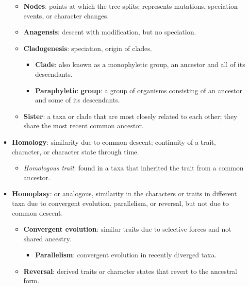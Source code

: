 \documentclass[12pt,a4paper]{article}
\begin{document}
\begin{itemize}
\begin{itemize}
\begin{itemize}
                \end{itemize}
            \item \textbf{Nodes}: points at which the tree splits; represents mutations, speciation events, or {\color{o-Sun}character changes}.
        \item {\color{false}\textbf{Anagensis}}: descent with modification, but {\color{false}no speciation}.
        \item {\color{true}\textbf{Cladogenesis}}: {\color{true}speciation}, origin of clades.
        \begin{itemize}
            \item \textbf{Clade}: also known as a {\color{o-Sun}monophyletic group}, an ancestor and {\color{o-Sun}all} of its descendants.
            \item \textbf{Paraphyletic group}: a group of organisms consisting of an ancestor and {\color{o-Sun}some} of its descendants.
        \end{itemize}
        \item \textbf{Sister}: a taxa or clade that are most closely related to each other; they {\color{o-Sun}share the most recent} common ancestor. 
    \end{itemize}
    \item \textbf{Homology}: similarity due to common descent; {\color{true}continuity} of a trait, character, or character state through time.
        \begin{itemize}
            \item \textit{Homologous trait}: found in a taxa that inherited the trait from a common ancestor.
        \end{itemize}
    \item \textbf{Homoplasy}: or analogous, similarity in the characters or traits in different taxa due to convergent evolution, parallelism, or reversal, but {\color{false}not due to common descent}.
        \begin{itemize}
            \item \textbf{Convergent evolution}: similar traits due to selective forces and {\color{false}not shared ancestry}.
                \begin{itemize}
                    \item \textbf{Parallelism}: convergent evolution in {\color{o-Sun}recently diverged} taxa.
                \end{itemize}
            \item \textbf{Reversal}: derived traits or character states that revert to the ancestral form.
        \end{itemize}
\end{itemize}
\end{document}

